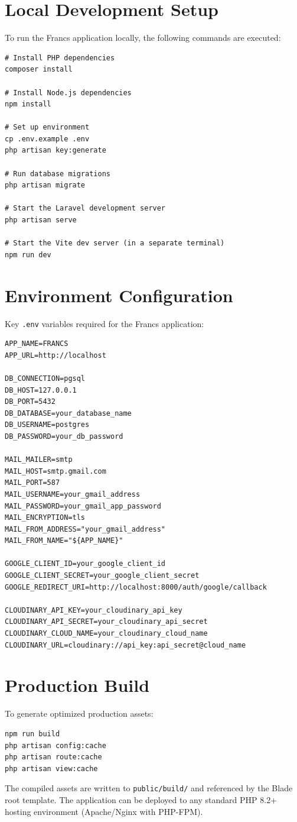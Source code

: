 \section{Local Development Setup}
To run the Francs application locally, the following commands are executed:

\begin{lstlisting}[style=phpstyle]
# Install PHP dependencies
composer install

# Install Node.js dependencies
npm install

# Set up environment
cp .env.example .env
php artisan key:generate

# Run database migrations
php artisan migrate

# Start the Laravel development server
php artisan serve

# Start the Vite dev server (in a separate terminal)
npm run dev
\end{lstlisting}

\section{Environment Configuration}
Key \texttt{.env} variables required for the Francs application:

\begin{lstlisting}[style=phpstyle]
APP_NAME=FRANCS
APP_URL=http://localhost

DB_CONNECTION=pgsql
DB_HOST=127.0.0.1
DB_PORT=5432
DB_DATABASE=your_database_name
DB_USERNAME=postgres
DB_PASSWORD=your_db_password

MAIL_MAILER=smtp
MAIL_HOST=smtp.gmail.com
MAIL_PORT=587
MAIL_USERNAME=your_gmail_address
MAIL_PASSWORD=your_gmail_app_password
MAIL_ENCRYPTION=tls
MAIL_FROM_ADDRESS="your_gmail_address"
MAIL_FROM_NAME="${APP_NAME}"

GOOGLE_CLIENT_ID=your_google_client_id
GOOGLE_CLIENT_SECRET=your_google_client_secret
GOOGLE_REDIRECT_URI=http://localhost:8000/auth/google/callback

CLOUDINARY_API_KEY=your_cloudinary_api_key
CLOUDINARY_API_SECRET=your_cloudinary_api_secret
CLOUDINARY_CLOUD_NAME=your_cloudinary_cloud_name
CLOUDINARY_URL=cloudinary://api_key:api_secret@cloud_name
\end{lstlisting}

\section{Production Build}
To generate optimized production assets:

\begin{lstlisting}[style=phpstyle]
npm run build
php artisan config:cache
php artisan route:cache
php artisan view:cache
\end{lstlisting}

The compiled assets are written to \texttt{public/build/} and referenced by the Blade root template. The application can be deployed to any standard PHP 8.2+ hosting environment (Apache/Nginx with PHP-FPM).
